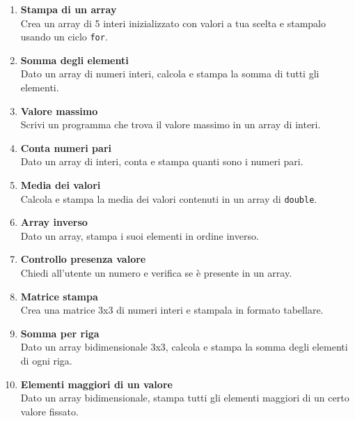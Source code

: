 \documentclass{article}
\begin{document}
\begin{enumerate}
    \item \textbf{Stampa di un array} \\
    Crea un array di 5 interi inizializzato con valori a tua scelta e stampalo usando un ciclo \texttt{for}.

    \item \textbf{Somma degli elementi} \\
    Dato un array di numeri interi, calcola e stampa la somma di tutti gli elementi.

    \item \textbf{Valore massimo} \\
    Scrivi un programma che trova il valore massimo in un array di interi.

    \item \textbf{Conta numeri pari} \\
    Dato un array di interi, conta e stampa quanti sono i numeri pari.

    \item \textbf{Media dei valori} \\
    Calcola e stampa la media dei valori contenuti in un array di \texttt{double}.

    \item \textbf{Array inverso} \\
    Dato un array, stampa i suoi elementi in ordine inverso.

    \item \textbf{Controllo presenza valore} \\
    Chiedi all'utente un numero e verifica se è presente in un array.

    \item \textbf{Matrice stampa} \\
    Crea una matrice 3x3 di numeri interi e stampala in formato tabellare.

    \item \textbf{Somma per riga} \\
    Dato un array bidimensionale 3x3, calcola e stampa la somma degli elementi di ogni riga.

    \item \textbf{Elementi maggiori di un valore} \\
    Dato un array bidimensionale, stampa tutti gli elementi maggiori di un certo valore fissato.
\end{enumerate}
\end{document}
